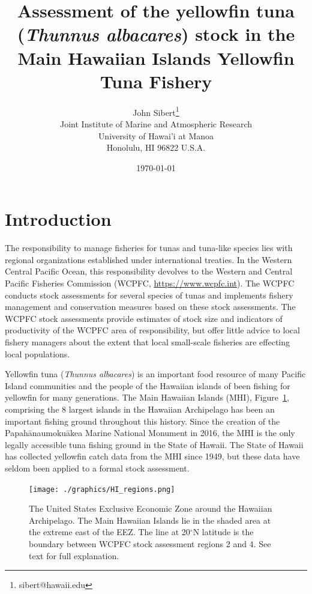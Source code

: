 \documentclass[12pt,letterpaper]{article}
\title{Assessment of the yellowfin tuna ({\it Thunnus albacares}) 
stock in the Main Hawaiian Islands Yellowfin Tuna Fishery}
\author{
John Sibert\thanks{sibert@hawaii.edu}\\
Joint Institute of Marine and Atmospheric Research\\
University of Hawai'i at Manoa\\
Honolulu, HI  96822 U.S.A.\\[0.125in]
\date{\today}
}
\newcommand\doublespacing{\baselineskip=1.6\normalbaselineskip}
\renewcommand\deg[1]{$^\circ$#1}
\newcommand\help[1]{\color{Magenta}{\it #1}\normalcolor}
\begin{document}
\maketitle


\begin{abstract}
\begin{center}\help{Write me!}\end{center}
\end{abstract}


\section*{Introduction}
The responsibility to manage fisheries for tunas and tuna-like species
lies with regional organizations established under international treaties.
In the Western Central Pacific Ocean, this responsibility devolves to
the Western and Central Pacific Fisheries Commission (WCPFC, 
\url{https://www.wcpfc.int}).
The WCPFC conducts stock assessments for several species of tunas and
implements fishery management and conservation measures based on
these stock assessments. The WCPFC stock assessments provide estimates
of stock size and indicators of productivity of the WCPFC area of
responsibility, but offer little advice to local fishery managers about
the extent that local small-scale fisheries are effecting local
populations.

Yellowfin tuna ({\it Thunnus albacares}) is an important food resource
of many Pacific Island communities and the people of the Hawaiian
islands of been fishing for yellowfin for many generations. 
The Main Hawaiian Islands (MHI), Figure~\ref{fig:mhimap},
comprising the 8 largest islands in the Hawaiian Archipelago
has been an important fishing ground throughout this history.
Since the creation of the Papah\={a}naumoku\={a}kea Marine National
Monument in 2016, the MHI is the only legally accessible tuna fishing ground
in the State of Hawaii.
The State of Hawaii has collected yellowfin catch data from the MHI
since 1949, but these data have seldom been applied to a formal stock
assessment.

\begin{figure}
\begin{center}
\texttt{[image: ./graphics/HI\_regions.png]}
\caption{\label{fig:mhimap}
The United States Exclusive Economic Zone around the Hawaiian
Archipelago. The Main Hawaiian Islands lie in the shaded area at the
extreme east of the EEZ. The line at 20\deg{N} latitude is the
boundary between WCPFC stock assessment regions 2 and 4. See text for
full explanation.
}
\end{center}
\end{figure}
\end{document}
